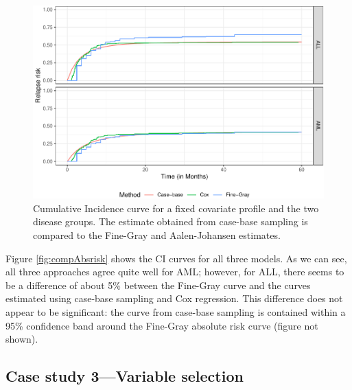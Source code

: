 \begin{Schunk}
\begin{figure}[ht]
\includegraphics[width=\textwidth,keepaspectratio=true]{./bmtcrr-risk-1} \caption{\label{fig:compAbsrisk} Cumulative Incidence curve for a fixed covariate profile and the two disease groups. The estimate obtained from case-base sampling is compared to the Fine-Gray and Aalen-Johansen estimates.}\label{fig:bmtcrr-risk}
\end{figure}
\end{Schunk}

Figure \ref{fig:compAbsrisk} shows the CI curves for all three models.
As we can see, all three approaches agree quite well for AML; however,
for ALL, there seems to be a difference of about 5\% between the
Fine-Gray curve and the curves estimated using case-base sampling and
Cox regression. This difference does not appear to be significant: the
curve from case-base sampling is contained within a 95\% confidence band
around the Fine-Gray absolute risk curve (figure not shown).

\hypertarget{case-study-3variable-selection}{%
\subsection{Case study 3---Variable
selection}\label{case-study-3variable-selection}}

